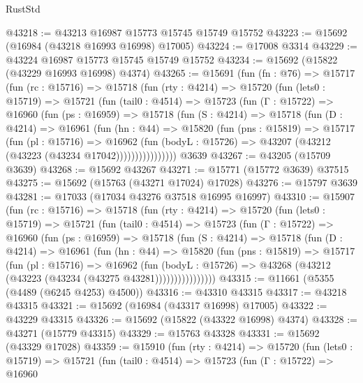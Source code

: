 \begin{lexlean}{RustStd}
\begin{coremodule}
@43218 := @43213 @16987 @15773 @15745 @15749 @15752
@43223 := @15692 (@16984 (@43218 @16993 @16998) @17005)
@43224 := @17008 @3314
@43229 := @43224 @16987 @15773 @15745 @15749 @15752
@43234 := @15692 (@15822 (@43229 @16993 @16998) @4374)
@43265 := @15691
    (fun (fn : @76) =>
    @15717
      (fun (rc : @15716) =>
      @15718
        (fun (rty : @4214) =>
        @15720
          (fun (lets0 : @15719) =>
          @15721
            (fun (tail0 : @4514) =>
            @15723
              (fun (Γ : @15722) =>
              @16960
                (fun (ps : @16959) =>
                @15718
                  (fun (S : @4214) =>
                  @15718
                    (fun (D : @4214) =>
                    @16961
                      (fun (hn : @44) =>
                      @15820
                        (fun (pns : @15819) =>
                        @15717
                          (fun (pl : @15716) =>
                          @16962
                            (fun (bodyL : @15726) =>
                            @43207 (@43212 (@43223 (@43234 @17042))))))))))))))))
    @3639
@43267 := @43205 (@15709 @3639)
@43268 := @15692 @43267
@43271 := @15771 (@15772 @3639) @37515
@43275 := @15692 (@15763 (@43271 @17024) @17028)
@43276 := @15797 @3639
@43281 := @17033 (@17034 @43276 @37518 @16995 @16997)
@43310 := @15907
    (fun (rc : @15716) =>
    @15718
      (fun (rty : @4214) =>
      @15720
        (fun (lets0 : @15719) =>
        @15721
          (fun (tail0 : @4514) =>
          @15723
            (fun (Γ : @15722) =>
            @16960
              (fun (ps : @16959) =>
              @15718
                (fun (S : @4214) =>
                @15718
                  (fun (D : @4214) =>
                  @16961
                    (fun (hn : @44) =>
                    @15820
                      (fun (pns : @15819) =>
                      @15717
                        (fun (pl : @15716) =>
                        @16962
                          (fun (bodyL : @15726) =>
                          @43268 (@43212 (@43223 (@43234 (@43275 @43281))))))))))))))))
@43315 := @11661 (@5355 (@4489 (@6245 @4253) @4500))
@43316 := @43310 @43315
@43317 := @43218 @43315
@43321 := @15692 (@16984 (@43317 @16998) @17005)
@43322 := @43229 @43315
@43326 := @15692 (@15822 (@43322 @16998) @4374)
@43328 := @43271 (@15779 @43315)
@43329 := @15763 @43328
@43331 := @15692 (@43329 @17028)
@43359 := @15910
    (fun (rty : @4214) =>
    @15720
      (fun (lets0 : @15719) =>
      @15721
        (fun (tail0 : @4514) =>
        @15723
          (fun (Γ : @15722) =>
          @16960

\end{coremodule}
\end{lexlean}
